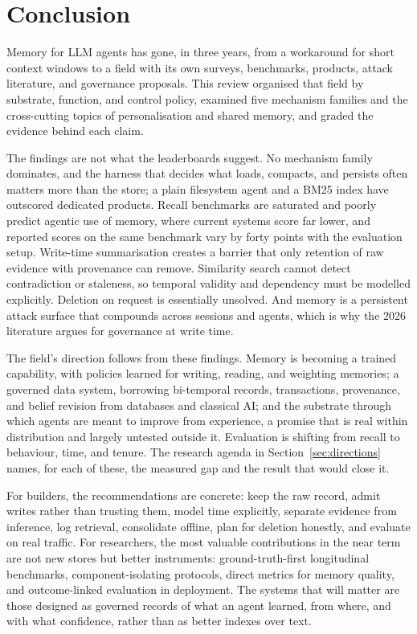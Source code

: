 \documentclass[11pt]{article}
\begin{document}
\section{Conclusion}
\label{sec:conclusion}

Memory for LLM agents has gone, in three years, from a workaround for short context windows to a field with its own surveys, benchmarks, products, attack literature, and governance proposals. This review organised that field by substrate, function, and control policy, examined five mechanism families and the cross-cutting topics of personalisation and shared memory, and graded the evidence behind each claim.

The findings are not what the leaderboards suggest. No mechanism family dominates, and the harness that decides what loads, compacts, and persists often matters more than the store; a plain filesystem agent and a BM25 index have outscored dedicated products. Recall benchmarks are saturated and poorly predict agentic use of memory, where current systems score far lower, and reported scores on the same benchmark vary by forty points with the evaluation setup. Write-time summarisation creates a barrier that only retention of raw evidence with provenance can remove. Similarity search cannot detect contradiction or staleness, so temporal validity and dependency must be modelled explicitly. Deletion on request is essentially unsolved. And memory is a persistent attack surface that compounds across sessions and agents, which is why the 2026 literature argues for governance at write time.

The field's direction follows from these findings. Memory is becoming a trained capability, with policies learned for writing, reading, and weighting memories; a governed data system, borrowing bi-temporal records, transactions, provenance, and belief revision from databases and classical AI; and the substrate through which agents are meant to improve from experience, a promise that is real within distribution and largely untested outside it. Evaluation is shifting from recall to behaviour, time, and tenure. The research agenda in Section~\ref{sec:directions} names, for each of these, the measured gap and the result that would close it.

For builders, the recommendations are concrete: keep the raw record, admit writes rather than trusting them, model time explicitly, separate evidence from inference, log retrieval, consolidate offline, plan for deletion honestly, and evaluate on real traffic. For researchers, the most valuable contributions in the near term are not new stores but better instruments: ground-truth-first longitudinal benchmarks, component-isolating protocols, direct metrics for memory quality, and outcome-linked evaluation in deployment. The systems that will matter are those designed as governed records of what an agent learned, from where, and with what confidence, rather than as better indexes over text.
\end{document}
